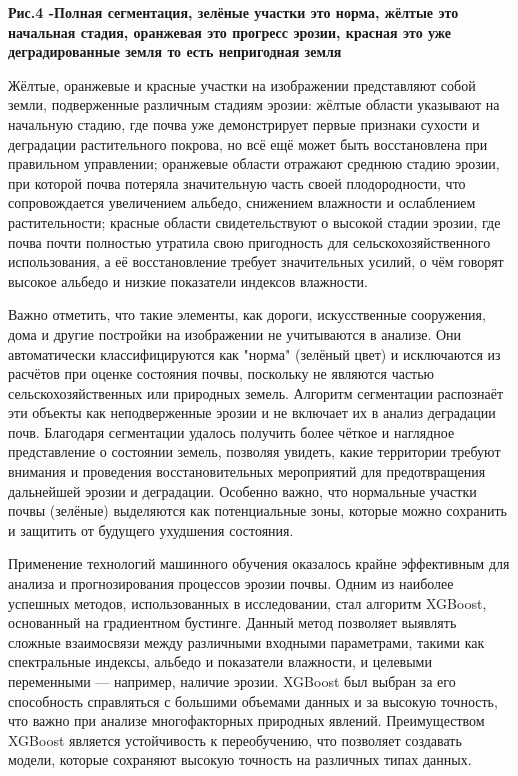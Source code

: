 {\bfseries Рис.4 -Полная сегментация, зелёные участки это норма, жёлтые
это начальная стадия, оранжевая это прогресс эрозии, красная это уже
деградированные земля то есть непригодная земля}

Жёлтые, оранжевые и красные участки на изображении представляют собой
земли, подверженные различным стадиям эрозии: жёлтые области указывают
на начальную стадию, где почва уже демонстрирует первые признаки сухости
и деградации растительного покрова, но всё ещё может быть восстановлена
при правильном управлении; оранжевые области отражают среднюю стадию
эрозии, при которой почва потеряла значительную часть своей
плодородности, что сопровождается увеличением альбедо, снижением
влажности и ослаблением растительности; красные области свидетельствуют
о высокой стадии эрозии, где почва почти полностью утратила свою
пригодность для сельскохозяйственного использования, а её восстановление
требует значительных усилий, о чём говорят высокое альбедо и низкие
показатели индексов влажности.

Важно отметить, что такие элементы, как дороги, искусственные
сооружения, дома и другие постройки на изображении не учитываются в
анализе. Они автоматически классифицируются как "норма" (зелёный цвет) и
исключаются из расчётов при оценке состояния почвы, поскольку не
являются частью сельскохозяйственных или природных земель. Алгоритм
сегментации распознаёт эти объекты как неподверженные эрозии и не
включает их в анализ деградации почв. Благодаря сегментации удалось
получить более чёткое и наглядное представление о состоянии земель,
позволяя увидеть, какие территории требуют внимания и проведения
восстановительных мероприятий для предотвращения дальнейшей эрозии и
деградации. Особенно важно, что нормальные участки почвы (зелёные)
выделяются как потенциальные зоны, которые можно сохранить и защитить от
будущего ухудшения состояния.

Применение технологий машинного обучения оказалось крайне эффективным
для анализа и прогнозирования процессов эрозии почвы. Одним из наиболее
успешных методов, использованных в исследовании, стал алгоритм XGBoost,
основанный на градиентном бустинге. Данный метод позволяет выявлять
сложные взаимосвязи между различными входными параметрами, такими как
спектральные индексы, альбедо и показатели влажности, и целевыми
переменными --- например, наличие эрозии. XGBoost был выбран за его
способность справляться с большими объемами данных и за высокую
точность, что важно при анализе многофакторных природных явлений.
Преимуществом XGBoost является устойчивость к переобучению, что
позволяет создавать модели, которые сохраняют высокую точность на
различных типах данных.

